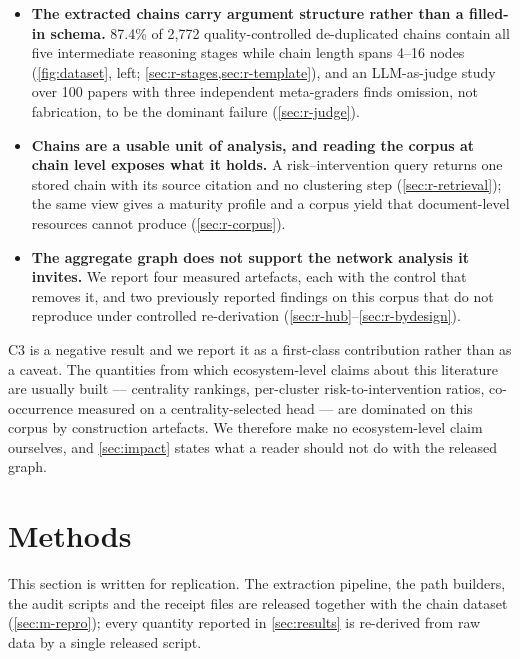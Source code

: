\documentclass[10pt,twocolumn,letterpaper]{article}
\begin{document}
\begin{itemize}
\setlength{\itemsep}{2pt}
\item[\textbf{C1}] \textbf{The extracted chains carry argument structure rather than a
filled-in schema.} 87.4\% of 2{,}772 quality-controlled de-duplicated chains contain all
five intermediate reasoning stages while chain length spans 4--16 nodes
(\cref{fig:dataset}, left; \cref{sec:r-stages,sec:r-template}), and an LLM-as-judge
study over 100 papers with three independent meta-graders finds omission, not
fabrication, to be the dominant failure (\cref{sec:r-judge}).
\item[\textbf{C2}] \textbf{Chains are a usable unit of analysis, and reading the corpus
at chain level exposes what it holds.} A risk--intervention query returns one stored
chain with its source citation and no clustering step (\cref{sec:r-retrieval}); the same
view gives a maturity profile and a corpus yield that document-level resources cannot
produce (\cref{sec:r-corpus}).
\item[\textbf{C3}] \textbf{The aggregate graph does not support the network analysis it
invites.} We report four measured artefacts, each with the control that removes it, and
two previously reported findings on this corpus that do not reproduce under controlled
re-derivation (\cref{sec:r-hub}--\cref{sec:r-bydesign}).
\end{itemize}

C3 is a negative result and we report it as a first-class contribution rather than as a
caveat. The quantities from which ecosystem-level claims about this literature are
usually built --- centrality rankings, per-cluster risk-to-intervention ratios,
co-occurrence measured on a centrality-selected head --- are dominated on this corpus by
construction artefacts. We therefore make no ecosystem-level claim ourselves, and
\cref{sec:impact} states what a reader should not do with the released graph.

\section{Methods}
\label{sec:methods}

This section is written for replication. The extraction pipeline, the path builders, the
audit scripts and the receipt files are released together with the chain dataset
(\cref{sec:m-repro}); every quantity reported in \cref{sec:results} is re-derived from
raw data by a single released script.
\end{document}
